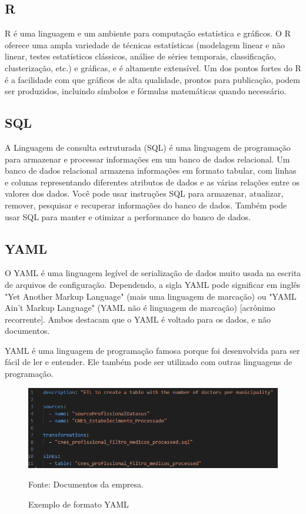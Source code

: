 \subsection{R}

R é uma linguagem e um ambiente para computação estatística e gráficos. O R oferece uma ampla variedade de técnicas estatísticas (modelagem linear e não linear, testes estatísticos clássicos, análise de séries temporais, classificação, clusterização, etc.) e gráficas, e é altamente extensível. Um dos pontos fortes do R é a facilidade com que gráficos de alta qualidade, prontos para publicação, podem ser produzidos, incluindo símbolos e fórmulas matemáticas quando necessário.\cite{r_project_about}

\subsection{SQL}

A Linguagem de consulta estruturada (SQL) é uma linguagem de programação para armazenar e processar informações em um banco de dados relacional. Um banco de dados relacional armazena informações em formato tabular, com linhas e colunas representando diferentes atributos de dados e as várias relações entre os valores dos dados. Você pode usar instruções SQL para armazenar, atualizar, remover, pesquisar e recuperar informações do banco de dados. Também pode usar SQL para manter e otimizar a performance do banco de dados.\cite{aws_what_is_sql}

\subsection{YAML}

O YAML é uma linguagem legível de serialização de dados muito usada na escrita de arquivos de configuração. Dependendo, a sigla YAML pode significar em inglês "Yet Another Markup Language" (mais uma linguagem de marcação) ou "YAML Ain’t Markup Language" (YAML não é linguagem de marcação) [acrônimo recorrente]. Ambos destacam que o YAML é voltado para os dados, e não documentos. 

YAML é uma linguagem de programação famosa porque foi desenvolvida para ser fácil de ler e entender. Ele também pode ser utilizado com outras linguagens de programação.\cite{redhat_what_is_yaml}

\begin{figure}[H]
  \centering
  \caption{Exemplo de formato YAML}\label{fig:yaml}
  \includegraphics[width=.6\linewidth]{imagens/yaml.png}
  \par
  \footnotesize{Fonte: Documentos da empresa.}
\end{figure}
